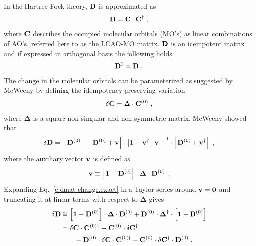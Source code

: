 \documentclass[aip,amsmath,amssymb,reprint,floatfix]{revtex4-1}
\newcommand{\BM}[1]{\bm{#1}}
\begin{document}
In the Hartree\hyp{}Fock theory,\cite{Roothaan.RevModPhys.1951} ${\bf D}$ is approximated as
%
\begin{equation}
 {\bf D} = {\bf C} \cdot {\bf C}^\dagger \;,
\end{equation}
%
where ${\bf C}$ describes the occupied molecular orbitals (MO's) as linear combinations
of AO's, referred here to as the LCAO-MO matrix.
${\bf D}$ is an idempotent matrix and if expressed in orthogonal basis the following holds
%
\begin{equation}
 {\bf D}^2 = {\bf D} \;.
\end{equation}
%
The change in the molecular orbitals can be parameterized as suggested by McWeeny\cite{McWeeny.RevModPhys.1960}
by defining the idempotency\hyp{}preserving variation
%
\begin{equation}
 \delta {\bf C} = {\BM\Delta} \cdot {\bf C}^{(0)} \;,
\end{equation}
%
where $\BM\Delta$ is a square non\hyp{}singular and non\hyp{}symmetric matrix.
McWeeny showed that
%
\begin{equation} \label{e:dmat-change.exact}
 \delta {\bf D} = -{\bf D}^{(0)} + \left[ {\bf D}^{(0)} + {\bf v} \right] \cdot
                                   \left[ {\bf 1} + {\bf v}^\dagger \cdot {\bf v} \right]^{-1} \cdot
                                   \left[ {\bf D}^{(0)} + {\bf v}^\dagger \right] \;,
\end{equation}
%
where the auxiliary vector ${\bf v}$ is defined as
%
\begin{equation}
 {\bf v} \equiv \left[ {\bf 1} - {\bf D}^{(0)} \right] \cdot {\BM\Delta} \cdot {\bf D}^{(0)}  \;.
\end{equation}
%
Expanding Eq.~\eqref{e:dmat-change.exact} in a Taylor series around ${\bf v}={\bf 0}$ and
truncating it at linear terms with respect to ${\BM\Delta}$ gives
%
\begin{subequations} 
 \begin{align}
 \delta {\bf D} &\cong \left[ {\bf 1} - {\bf D}^{(0)} \right] \cdot {\BM\Delta} \cdot {\bf D}^{(0)} + 
                        {\bf D}^{(0)} \cdot {\BM\Delta}^\dagger \cdot \left[ {\bf 1} - {\bf D}^{(0)} \right]  
 \label{e:dD-1} \\  &= 
  \delta {\bf C} \cdot {\bf C}^{(0)\dagger} + {\bf C}^{(0)} \cdot \delta {\bf C}^\dagger \nonumber \\
           &\qquad - {\bf D}^{(0)} \cdot \delta {\bf C} \cdot {\bf C}^{{(0)}\dagger} 
                   - {\bf C}^{(0)} \cdot \delta {\bf C}^\dagger \cdot {\bf D}^{(0)}  \;.
 \label{e:dD-2}
 \end{align}
\end{subequations}
\end{document}
